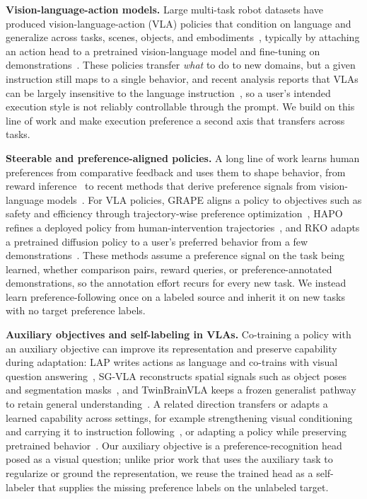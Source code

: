 \documentclass{article}
\begin{document}
\textbf{Vision-language-action models.}
Large multi-task robot datasets have produced vision-language-action (VLA) policies that condition on language and generalize across tasks, scenes, objects, and embodiments~\citep{o2024open, kim2024openvla, black2024pi0}, typically by attaching an action head to a pretrained vision-language model and fine-tuning on demonstrations~\citep{kim2024openvla, kim2025oft}.
These policies transfer \emph{what} to do to new domains, but a given instruction still maps to a single behavior, and recent analysis reports that VLAs can be largely insensitive to the language instruction~\citep{liberoplus}, so a user's intended execution style is not reliably controllable through the prompt.
We build on this line of work and make execution preference a second axis that transfers across tasks.

\textbf{Steerable and preference-aligned policies.}
A long line of work learns human preferences from comparative feedback and uses them to shape behavior, from reward inference~\citep{Frnkranz2010PreferenceLA, Sadigh2017ActivePL, Peng2025UUPL} to recent methods that derive preference signals from vision-language models~\citep{ghosh2025prefvlm, singh2025varp}.
For VLA policies, GRAPE aligns a policy to objectives such as safety and efficiency through trajectory-wise preference optimization~\citep{zhang2024grape}, HAPO refines a deployed policy from human-intervention trajectories~\citep{xia2025hapo}, and RKO adapts a pretrained diffusion policy to a user's preferred behavior from a few demonstrations~\citep{moletta2026rko}.
These methods assume a preference signal on the task being learned, whether comparison pairs, reward queries, or preference-annotated demonstrations, so the annotation effort recurs for every new task.
We instead learn preference-following once on a labeled source and inherit it on new tasks with no target preference labels.

\textbf{Auxiliary objectives and self-labeling in VLAs.}
Co-training a policy with an auxiliary objective can improve its representation and preserve capability during adaptation: LAP writes actions as language and co-trains with visual question answering~\citep{zha2026lap}, SG-VLA reconstructs spatial signals such as object poses and segmentation masks~\citep{tu2026sgvla}, and TwinBrainVLA keeps a frozen generalist pathway to retain general understanding~\citep{yu2026twinbrainvla}.
A related direction transfers or adapts a learned capability across settings, for example strengthening visual conditioning and carrying it to instruction following~\citep{chen2026vista}, or adapting a policy while preserving pretrained behavior~\citep{zhong2026vlaopd}.
Our auxiliary objective is a preference-recognition head posed as a visual question; unlike prior work that uses the auxiliary task to regularize or ground the representation, we reuse the trained head as a self-labeler that supplies the missing preference labels on the unlabeled target.
\end{document}
